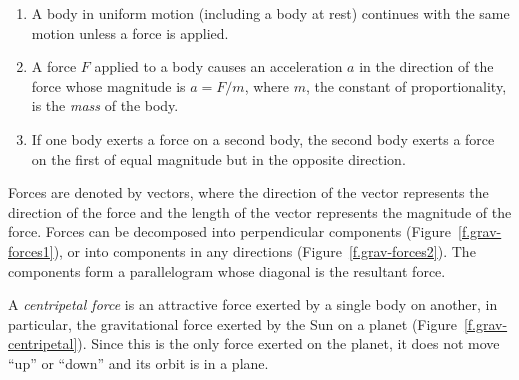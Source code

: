 \begin{enumerate}
\item A body in uniform motion (including a body at rest) continues with the same motion unless a force is applied.
\item A force $F$ applied to a body causes an acceleration $a$ in the direction of the force whose magnitude is $a=F/m$, where $m$, the constant of proportionality, is the \emph{mass} of the body.
\item If one body exerts a force on a second body, the second body exerts a force on the first of equal magnitude but in the opposite direction.
\end{enumerate}
Forces are denoted by vectors, where the direction of the vector represents the direction of the force and the length of the vector represents the magnitude of the force. Forces can be decomposed into perpendicular components (Figure~\ref{f.grav-forces1}), or into components in any directions (Figure~\ref{f.grav-forces2}). The components form a parallelogram whose diagonal is the resultant force.

A \emph{centripetal force} is an attractive force exerted by a single body on another, in particular, the gravitational force exerted by the Sun on a planet (Figure~\ref{f.grav-centripetal}). Since this is the only force exerted on the planet, it does not move ``up'' or ``down'' and its orbit is in a plane.


